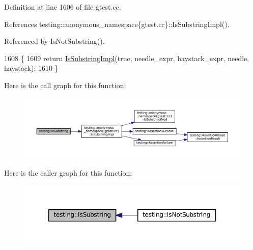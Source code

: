 Definition at line 1606 of file gtest.\+cc.



References testing\+::anonymous\+\_\+namespace\{gtest.\+cc\}\+::\+Is\+Substring\+Impl().



Referenced by Is\+Not\+Substring().


\begin{DoxyCode}
1608                                               \{
1609   \textcolor{keywordflow}{return} \hyperlink{namespacetesting_1_1anonymous__namespace_02gtest_8cc_03_a0e1cb1e2b03a87a9c893322e4caab670}{IsSubstringImpl}(\textcolor{keyword}{true}, needle\_expr, haystack\_expr, needle, haystack);
1610 \}
\end{DoxyCode}
Here is the call graph for this function\+:
\nopagebreak
\begin{figure}[H]
\begin{center}
\leavevmode
\includegraphics[width=350pt]{namespacetesting_a390c4f66fe7e9098117eb77e5fffa4ad_cgraph}
\end{center}
\end{figure}
Here is the caller graph for this function\+:
\nopagebreak
\begin{figure}[H]
\begin{center}
\leavevmode
\includegraphics[width=350pt]{namespacetesting_a390c4f66fe7e9098117eb77e5fffa4ad_icgraph}
\end{center}
\end{figure}
\mbox{\label{namespacetesting_aa1c82529c7591d2a9fd016de45dd9113}} 
